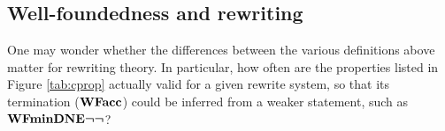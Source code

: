 \begin{enumerate}

\end{enumerate}




\subsection{Well-foundedness and rewriting}

One may wonder whether the differences between the various definitions above matter for
rewriting theory.  In particular, how often are the properties listed in
Figure \ref{tab:cprop} actually valid for a given rewrite system, so that its termination
($\mathbf{WFacc}$) could be inferred from a weaker statement, such as $\mathbf{WFminDNE}\boldsymbol{\lnot\lnot}$?

